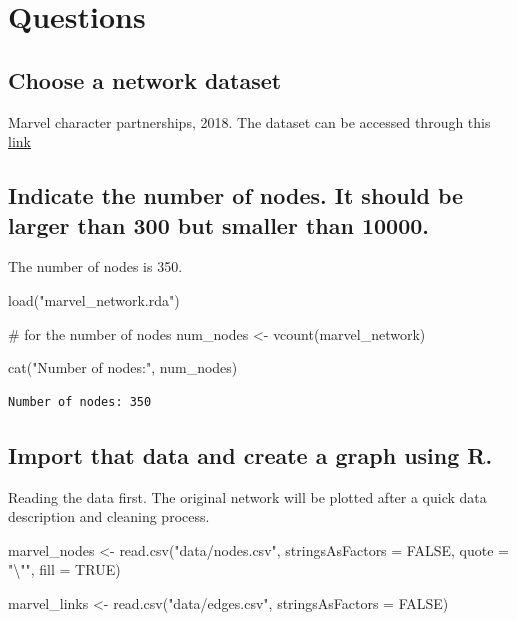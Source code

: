 \documentclass[
  letterpaper,
  DIV=11,
  numbers=noendperiod]{scrartcl}
\newenvironment{Shaded}{\begin{snugshade}}{\end{snugshade}}
\newcommand{\AttributeTok}[1]{\textcolor[rgb]{0.40,0.45,0.13}{#1}}
\newcommand{\CommentTok}[1]{\textcolor[rgb]{0.37,0.37,0.37}{#1}}
\newcommand{\ConstantTok}[1]{\textcolor[rgb]{0.56,0.35,0.01}{#1}}
\newcommand{\FunctionTok}[1]{\textcolor[rgb]{0.28,0.35,0.67}{#1}}
\newcommand{\NormalTok}[1]{\textcolor[rgb]{0.00,0.23,0.31}{#1}}
\newcommand{\OtherTok}[1]{\textcolor[rgb]{0.00,0.23,0.31}{#1}}
\newcommand{\SpecialCharTok}[1]{\textcolor[rgb]{0.37,0.37,0.37}{#1}}
\newcommand{\StringTok}[1]{\textcolor[rgb]{0.13,0.47,0.30}{#1}}
\begin{document}
\section{Questions}\label{questions}

\subsection{Choose a network dataset}\label{choose-a-network-dataset}

Marvel character partnerships, 2018. The dataset can be accessed through
this \href{https://networks.skewed.de/net/marvel_partnerships}{link}

\subsection{Indicate the number of nodes. It should be larger than 300
but smaller than
10000.}\label{indicate-the-number-of-nodes.-it-should-be-larger-than-300-but-smaller-than-10000.}

The number of nodes is 350.

\begin{Shaded}
\begin{Highlighting}[]
\FunctionTok{load}\NormalTok{(}\StringTok{"marvel\_network.rda"}\NormalTok{)}

\CommentTok{\# for the number of nodes}
\NormalTok{num\_nodes }\OtherTok{\textless{}{-}} \FunctionTok{vcount}\NormalTok{(marvel\_network)}

\FunctionTok{cat}\NormalTok{(}\StringTok{"Number of nodes:"}\NormalTok{, num\_nodes)}
\end{Highlighting}
\end{Shaded}

\begin{verbatim}
Number of nodes: 350
\end{verbatim}

\subsection{Import that data and create a graph using
R.}\label{import-that-data-and-create-a-graph-using-r.}

Reading the data first. The original network will be plotted after a
quick data description and cleaning process.

\begin{Shaded}
\begin{Highlighting}[]
\NormalTok{marvel\_nodes }\OtherTok{\textless{}{-}} \FunctionTok{read.csv}\NormalTok{(}\StringTok{"data/nodes.csv"}\NormalTok{, }\AttributeTok{stringsAsFactors =} \ConstantTok{FALSE}\NormalTok{,}
                         \AttributeTok{quote =} \StringTok{"}\SpecialCharTok{\textbackslash{}"}\StringTok{"}\NormalTok{, }\AttributeTok{fill =} \ConstantTok{TRUE}\NormalTok{)}

\NormalTok{marvel\_links }\OtherTok{\textless{}{-}} \FunctionTok{read.csv}\NormalTok{(}\StringTok{"data/edges.csv"}\NormalTok{, }\AttributeTok{stringsAsFactors =} \ConstantTok{FALSE}\NormalTok{)}
\end{Highlighting}
\end{Shaded}
\end{document}
